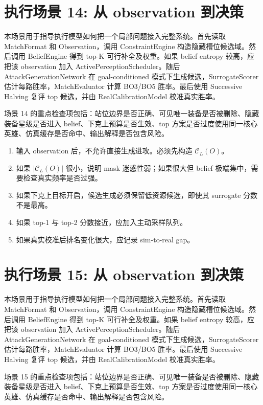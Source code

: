 \documentclass[UTF8,12pt,openany]{ctexbook}
\newcommand{\Ccal}{\mathcal{C}}
\begin{document}
\section{执行场景 14: 从 observation 到决策}
本场景用于指导执行模型如何把一个局部问题接入完整系统。首先读取 MatchFormat 和 Observation，调用 ConstraintEngine 构造隐藏槽位候选域。然后调用 BeliefEngine 得到 top-K 可行补全及权重。如果 belief entropy 较高，应把该 observation 加入 ActivePerceptionScheduler。随后 AttackGenerationNetwork 在 goal-conditioned 模式下生成候选，SurrogateScorer 估计每路胜率，MatchEvaluator 计算 BO3/BO5 胜率。最后使用 Successive Halving 复评 top 候选，并由 RealCalibrationModel 校准真实胜率。

场景 14 的重点检查项包括：站位边界是否正确、可见唯一装备是否被删除、隐藏装备星级是否进入 belief、下克上预算是否生效、top 方案是否过度使用同一核心英雄、仿真缓存是否命中、输出解释是否包含风险。

\begin{enumerate}[leftmargin=2em]
\item 输入 observation 后，不允许直接生成进攻。必须先构造 $\Ccal_L(O)$。
\item 如果 $|\Ccal_L(O)|$ 很小，说明 mask 迷惑性弱；如果很大但 belief 极端集中，需要检查真实频率是否过强。
\item 如果下克上目标开启，候选生成必须保留低资源候选，即使其 surrogate 分数不是最高。
\item 如果 top-1 与 top-2 分数接近，应加入主动采样队列。
\item 如果真实校准后排名变化很大，应记录 sim-to-real gap。
\end{enumerate}


\section{执行场景 15: 从 observation 到决策}
本场景用于指导执行模型如何把一个局部问题接入完整系统。首先读取 MatchFormat 和 Observation，调用 ConstraintEngine 构造隐藏槽位候选域。然后调用 BeliefEngine 得到 top-K 可行补全及权重。如果 belief entropy 较高，应把该 observation 加入 ActivePerceptionScheduler。随后 AttackGenerationNetwork 在 goal-conditioned 模式下生成候选，SurrogateScorer 估计每路胜率，MatchEvaluator 计算 BO3/BO5 胜率。最后使用 Successive Halving 复评 top 候选，并由 RealCalibrationModel 校准真实胜率。

场景 15 的重点检查项包括：站位边界是否正确、可见唯一装备是否被删除、隐藏装备星级是否进入 belief、下克上预算是否生效、top 方案是否过度使用同一核心英雄、仿真缓存是否命中、输出解释是否包含风险。
\end{document}
